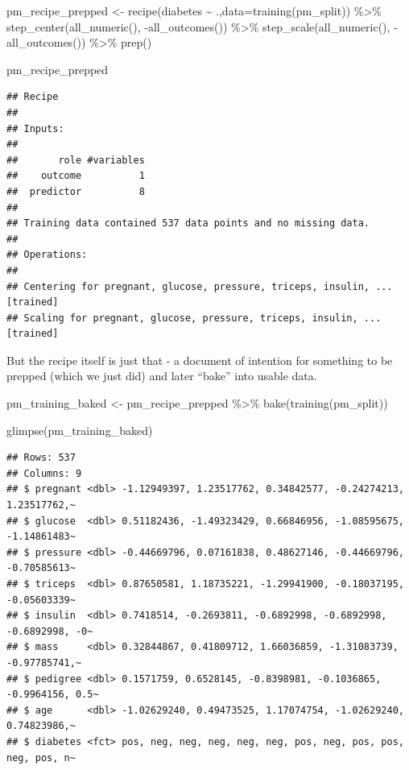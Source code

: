 \documentclass[
]{article}
\newenvironment{Shaded}{\begin{snugshade}}{\end{snugshade}}
\newcommand{\AttributeTok}[1]{\textcolor[rgb]{0.77,0.63,0.00}{#1}}
\newcommand{\FunctionTok}[1]{\textcolor[rgb]{0.00,0.00,0.00}{#1}}
\newcommand{\NormalTok}[1]{#1}
\newcommand{\OtherTok}[1]{\textcolor[rgb]{0.56,0.35,0.01}{#1}}
\newcommand{\SpecialCharTok}[1]{\textcolor[rgb]{0.00,0.00,0.00}{#1}}
\begin{document}
\begin{Shaded}
\begin{Highlighting}[]
\NormalTok{pm\_recipe\_prepped }\OtherTok{\textless{}{-}} \FunctionTok{recipe}\NormalTok{(diabetes }\SpecialCharTok{\textasciitilde{}}\NormalTok{ .,}\AttributeTok{data=}\FunctionTok{training}\NormalTok{(pm\_split)) }\SpecialCharTok{\%\textgreater{}\%}
  \FunctionTok{step\_center}\NormalTok{(}\FunctionTok{all\_numeric}\NormalTok{(), }\SpecialCharTok{{-}}\FunctionTok{all\_outcomes}\NormalTok{()) }\SpecialCharTok{\%\textgreater{}\%}
  \FunctionTok{step\_scale}\NormalTok{(}\FunctionTok{all\_numeric}\NormalTok{(), }\SpecialCharTok{{-}}\FunctionTok{all\_outcomes}\NormalTok{()) }\SpecialCharTok{\%\textgreater{}\%}
  \FunctionTok{prep}\NormalTok{()}

\NormalTok{pm\_recipe\_prepped}
\end{Highlighting}
\end{Shaded}

\begin{verbatim}
## Recipe
## 
## Inputs:
## 
##       role #variables
##    outcome          1
##  predictor          8
## 
## Training data contained 537 data points and no missing data.
## 
## Operations:
## 
## Centering for pregnant, glucose, pressure, triceps, insulin, ... [trained]
## Scaling for pregnant, glucose, pressure, triceps, insulin, ... [trained]
\end{verbatim}

But the recipe itself is just that - a document of intention for
something to be prepped (which we just did) and later ``bake'' into
usable data.

\begin{Shaded}
\begin{Highlighting}[]
\NormalTok{pm\_training\_baked }\OtherTok{\textless{}{-}}\NormalTok{ pm\_recipe\_prepped }\SpecialCharTok{\%\textgreater{}\%}
  \FunctionTok{bake}\NormalTok{(}\FunctionTok{training}\NormalTok{(pm\_split)) }

\FunctionTok{glimpse}\NormalTok{(pm\_training\_baked)}
\end{Highlighting}
\end{Shaded}

\begin{verbatim}
## Rows: 537
## Columns: 9
## $ pregnant <dbl> -1.12949397, 1.23517762, 0.34842577, -0.24274213, 1.23517762,~
## $ glucose  <dbl> 0.51182436, -1.49323429, 0.66846956, -1.08595675, -1.14861483~
## $ pressure <dbl> -0.44669796, 0.07161838, 0.48627146, -0.44669796, -0.70585613~
## $ triceps  <dbl> 0.87650581, 1.18735221, -1.29941900, -0.18037195, -0.05603339~
## $ insulin  <dbl> 0.7418514, -0.2693811, -0.6892998, -0.6892998, -0.6892998, -0~
## $ mass     <dbl> 0.32844867, 0.41809712, 1.66036859, -1.31083739, -0.97785741,~
## $ pedigree <dbl> 0.1571759, 0.6528145, -0.8398981, -0.1036865, -0.9964156, 0.5~
## $ age      <dbl> -1.02629240, 0.49473525, 1.17074754, -1.02629240, 0.74823986,~
## $ diabetes <fct> pos, neg, neg, neg, neg, neg, pos, neg, pos, pos, neg, pos, n~
\end{verbatim}
\end{document}
